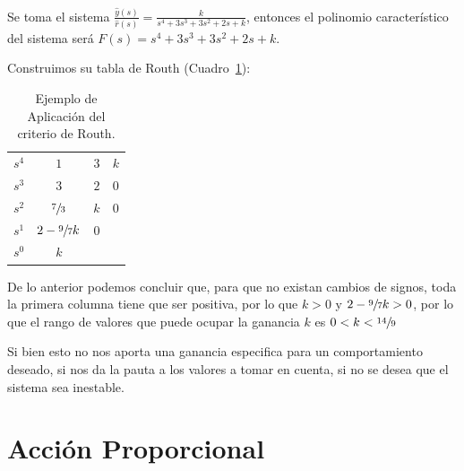             Se toma el sistema $\frac{\hat{y}(s)}{\hat{r}(s)} = \frac{k}{s^4 + 3 s^3 + 3 s^2 + 2 s + k}$, entonces el polinomio característico del sistema será $F(s) = s^4 + 3 s^3 + 3 s^2 + 2 s + k$.

            Construimos su tabla de Routh (Cuadro~\ref{tab:EjemploAplicacion}):

            \begin{table}[htbp]
                \centering
                \begin{tabular}{c|c c c}
                $s^4$ & $1$ & $3$ & $k$ \\
                $s^3$ & $3$ & $2$ & $0$ \\
                $s^2$ & $\sfrac{7}{3}$ & $k$ & $0$ \\
                $s^1$ & $2 - \sfrac{9}{7} k$ & $0$ \\
                $s^0$ & $k$
                \end{tabular}
                \caption{\label{tab:EjemploAplicacion}Ejemplo de Aplicación del criterio de Routh.}
            \end{table}

            De lo anterior podemos concluir que, para que no existan cambios de signos, toda la primera columna tiene que ser positiva, por lo que $k > 0$ y  $2 - \sfrac{9}{7} k > 0$, por lo que el rango de valores que puede ocupar la ganancia $k$ es $0 < k < \sfrac{14}{9}$

            Si bien esto no nos aporta una ganancia especifica para un comportamiento deseado, si nos da la pauta a los valores a tomar en cuenta, si no se desea que el sistema sea inestable.


    \newpage
    \section{Acción Proporcional}

